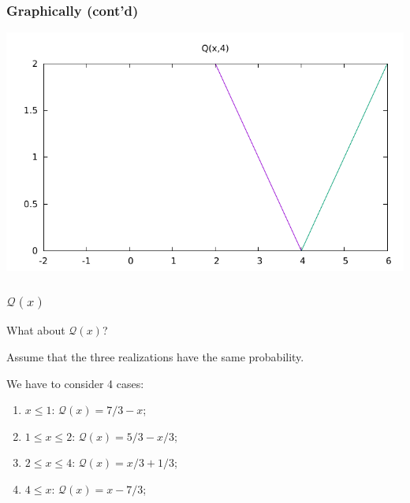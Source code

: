 \documentclass{beamer}
\begin{document}
\begin{frame}
\frametitle{Graphically (cont'd)}

\begin{center}
\begin{minipage}{0.9\textwidth}
\includegraphics[width=\textwidth]{recourse_4.pdf}
\end{minipage}
\end{center}

\end{frame}

\begin{frame}
\frametitle{$\mathcal{Q}(x)$}

What about $\mathcal{Q}(x)$?

\mbox{}

Assume that the three realizations have the same probability.

\mbox{}

We have to consider 4 cases:
\begin{enumerate}
\item
$x \leq 1$: $\mathcal{Q}(x) = 7/3 - x$;
\item
$1 \leq x \leq 2$: $\mathcal{Q}(x) = 5/3-x/3$;
\item
$2 \leq x \leq 4$: $\mathcal{Q}(x) = x/3+1/3$;
\item
$4 \leq x$: $\mathcal{Q}(x) = x-7/3$;
\end{enumerate}

\end{frame}
\end{document}
